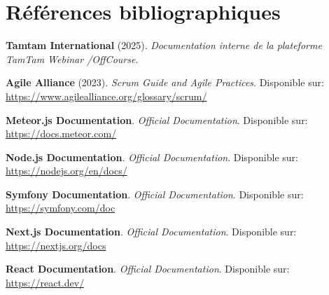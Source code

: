 \section*{Références bibliographiques}

\textbf{Tamtam International} (2025). \textit{Documentation interne de la plateforme TamTam Webinar /OffCourse}.

\textbf{Agile Alliance} (2023). \textit{Scrum Guide and Agile Practices}. Disponible sur: \url{https://www.agilealliance.org/glossary/scrum/}

\textbf{Meteor.js Documentation}. \textit{Official Documentation}. Disponible sur: \url{https://docs.meteor.com/}

\textbf{Node.js Documentation}. \textit{Official Documentation}. Disponible sur: \url{https://nodejs.org/en/docs/}

\textbf{Symfony Documentation}. \textit{Official Documentation}. Disponible sur: \url{https://symfony.com/doc}

\textbf{Next.js Documentation}. \textit{Official Documentation}. Disponible sur: \url{https://nextjs.org/docs}

\textbf{React Documentation}. \textit{Official Documentation}. Disponible sur: \url{https://react.dev/}
